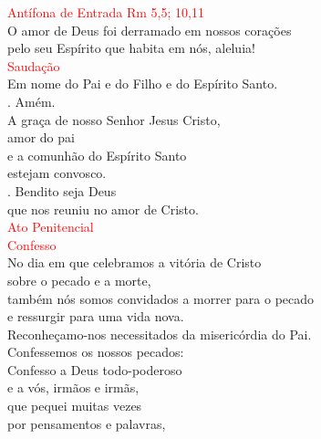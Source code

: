 \documentclass{book}
\begin{document}
\begin{flushleft}

    \vspace{.5cm}
    \textcolor{red}{Antífona de Entrada}
    \hspace{\fill}
    \textcolor{red}{Rm 5,5; 10,11}
    \vspace{.2cm} \\
    O amor de Deus foi derramado em nossos corações \\
    pelo seu Espírito que habita em nós, aleluia!
    \vspace{.2cm} \\
    \textcolor{red}{Saudação}
    \vspace{.2cm}\\
    Em nome do Pai e do Filho e do Espírito Santo. \\
    {\color{red} \Rbar.} Amém. \\
    A graça de nosso Senhor Jesus Cristo, \\
    amor do pai \\
    e a comunhão do Espírito Santo \\
    estejam convosco. \\
    {\color{red} \Rbar.} Bendito seja Deus \\
    que nos reuniu no amor de Cristo.
    \vspace{.2cm} \\
    \textcolor{red}{Ato Penitencial}
    \vspace{.2cm} \\
    \textcolor{red}{Confesso}
    \vspace{.2cm} \\
    No dia em que celebramos a vitória de Cristo \\
    sobre o pecado e a morte, \\
    também nós somos convidados a morrer para o pecado \\
    e ressurgir para uma vida nova. \\
    Reconheçamo-nos necessitados da misericórdia do Pai.
    \vspace{.1cm} \\
    Confessemos os nossos pecados:
    \vspace{.1cm} \\
    Confesso a Deus todo-poderoso \\
    e a vós, irmãos e irmãs, \\
    que pequei muitas vezes \\
    por pensamentos e palavras, \\

\end{flushleft}
\end{document}
